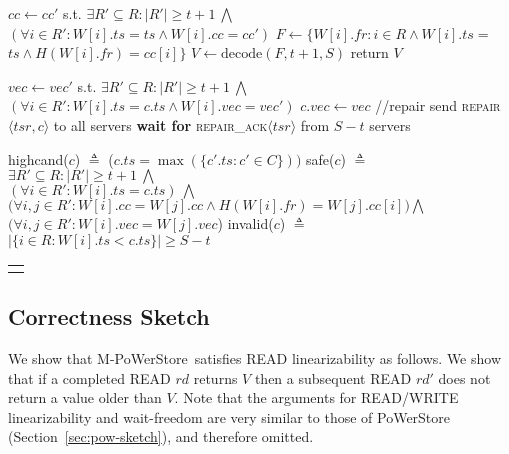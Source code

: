 \documentclass[10pt,conference,compsocconf]{IEEEtran}
\newcommand{\protocol}{PoWerStore}
\newcommand{\mprotocol}{M-PoWerStore}
\begin{document}
\begin{algo}[t]
\begin{distribalgo}[1]
\smallskip
{}
\STATE $cc \leftarrow cc'$ s.t. $\exists R' \subseteq R : |R'| \geq t+1\ \bigwedge$\\ $(\forall i \in R' : W[i].ts = ts \wedge W[i].cc = cc')$ \label{alg2:reader:cc}
\STATE $F \leftarrow \{W[i].fr : i $$\in$$ R \wedge W[i].ts $$=$$ ts \wedge H(W[i].fr) $$=$$ cc[i]\}$ \label{alg2:reader:fr}
\STATE $V \leftarrow \mathrm{decode}(F, t+1, S)$ \label{alg2:reader:decode}
\STATE return $V$
\ENDINDENT

\smallskip
{}
\STATE $vec \leftarrow vec'$ s.t. $\exists R' \subseteq R : |R'| \geq t+1\ \bigwedge$\\ $(\forall i \in R' : W[i].ts = c.ts \wedge W[i].vec = vec')$
 \label{alg2:reader:vec-integrity}
\STATE $c.vec \leftarrow vec$ \label{alg2:reader:repair}\hfill //repair
\STATE send \textsc{repair}$\langle tsr, c \rangle$ to all servers
\STATE \textbf{wait for} \textsc{repair\_ack}$\langle tsr \rangle$ from $S-t$ servers
\ENDIF
\ENDINDENT

\smallskip
{}
\STATE \textsf{highcand}($c$) $\triangleq$ ($c.ts = \max(\{c'.ts : c' \in C\}))$
\smallskip
\STATE \textsf{safe}($c$) $\triangleq$ $\exists R' \subseteq R: |R'| \geq t+1 \ \bigwedge$\\ \label{alg2:reader:safe}
$(\forall i \in R': W[i].ts = c.ts)\ \bigwedge$\\
$(\forall i,j \in R'$$:$$W[i].cc $$=$$ W[j].cc \wedge H(W[i].fr) $$=$$ W[j].cc[i])\bigwedge$\\
$(\forall i,j \in R': W[i].vec = W[j].vec$)
\smallskip
\STATE \textsf{invalid}($c$) $\triangleq$ $|\{i \in R: W[i].ts < c.ts \}| \geq S-t$
\ENDINDENT
\setcounter{alg:client1:lines}{\value{ALC@line}}
\end{distribalgo}
\begin{tabular}{c}\hline\mbox{}\hspace{0.45\textwidth}\mbox{}\end{tabular}
\caption{{Algorithm of client $r$ in \mprotocol.}}\label{alg2:reader}
\vspace{-1 em}
\end{algo}


\subsection{Correctness Sketch}
We show that \mprotocol\ satisfies \textsc{READ} linearizability as follows. We show that if a completed \textsc{READ} $rd$ returns $V$ then a subsequent \textsc{READ} $rd'$ does not return a value older than $V$. Note that the arguments for \textsc{READ}/\textsc{WRITE} linearizability and wait-freedom are very similar to those of \protocol{} (Section~\ref{sec:pow-sketch}), and therefore omitted.
\end{document}
